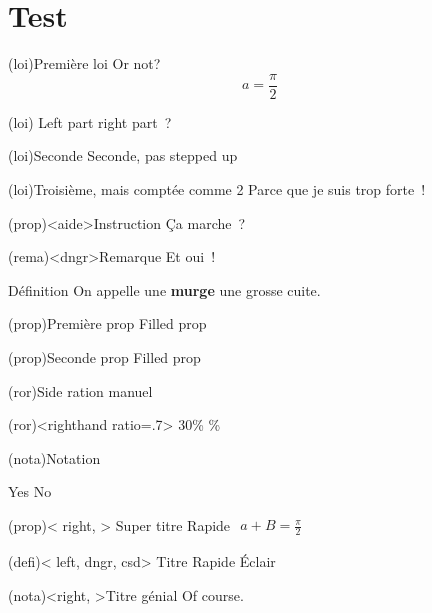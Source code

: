 \documentclass[a4paper, 10pt, garamond]{book}
\begin{document}
\chapter{Test}

\begin{tcb*}[box](loi){Première loi}
	Or not?
	\[
		a = \frac{\pi}{2}
	\]
	\begin{isd}(loi)
		Left part
		\tcblower
		right part~?
	\end{isd}
\end{tcb*}

\begin{tcb}[lft](loi){Seconde}
	Seconde, pas stepped up
\end{tcb}

\begin{tcb*}[box](loi){Troisième, mais comptée comme 2}
	Parce que je suis trop forte~!
\end{tcb*}

\begin{tcb}[itc](prop)<aide>{Instruction}
	Ça marche~?
\end{tcb}

\begin{tcb}(rema)<dngr>{Remarque}
	Et oui~!
\end{tcb}

\begin{tcb}[box]{Définition}
	On appelle une \textbf{murge} une grosse cuite.
\end{tcb}

\begin{tcb*}[fil](prop){Première prop}
	Filled prop
\end{tcb*}

\begin{tcb}[fil](prop){Seconde prop}
	Filled prop
\end{tcb}

\begin{tcb}[box](ror){Side ration manuel}
	\lipsum[1]
	\smallbreak
	\begin{isd}(ror)<righthand ratio=.7>
		30\%
		\%
	\end{isd}
\end{tcb}

\begin{tcb*}[box](nota){Notation}
	\lipsum[1]
	\begin{isd*}
		Yes
		\tcblower
		No
	\end{isd*}
	\lipsum[2]
\end{tcb*}

\sde[box](prop)< right, >
{Super titre}{
	Rapide
}{
	$
		\begin{gathered}
			a + B = \frac{\pi}{2}
		\end{gathered}
	$
}


\sde*[box](defi)< left, dngr, csd>
{Titre}{
	Rapide
}{
	Éclair
}

\sde[lft](nota)<right, >{Titre génial}{
	\lipsum[2]
}{
	Of course.
}
\end{document}
